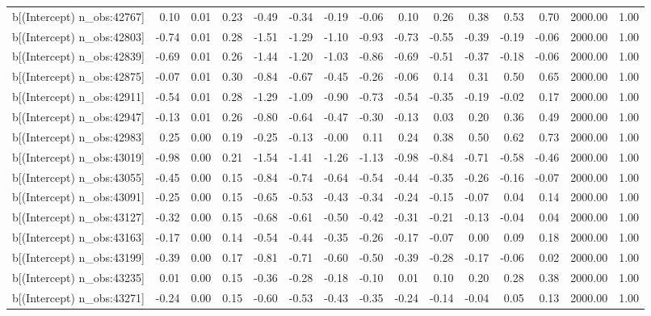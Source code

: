 \begin{table}[ht]
\begin{tabular}{rrrrrrrrrrrrrrr}
  b[(Intercept) n\_obs:42767] & 0.10 & 0.01 & 0.23 & -0.49 & -0.34 & -0.19 & -0.06 & 0.10 & 0.26 & 0.38 & 0.53 & 0.70 & 2000.00 & 1.00 \\ 
  b[(Intercept) n\_obs:42803] & -0.74 & 0.01 & 0.28 & -1.51 & -1.29 & -1.10 & -0.93 & -0.73 & -0.55 & -0.39 & -0.19 & -0.06 & 2000.00 & 1.00 \\ 
  b[(Intercept) n\_obs:42839] & -0.69 & 0.01 & 0.26 & -1.44 & -1.20 & -1.03 & -0.86 & -0.69 & -0.51 & -0.37 & -0.18 & -0.06 & 2000.00 & 1.00 \\ 
  b[(Intercept) n\_obs:42875] & -0.07 & 0.01 & 0.30 & -0.84 & -0.67 & -0.45 & -0.26 & -0.06 & 0.14 & 0.31 & 0.50 & 0.65 & 2000.00 & 1.00 \\ 
  b[(Intercept) n\_obs:42911] & -0.54 & 0.01 & 0.28 & -1.29 & -1.09 & -0.90 & -0.73 & -0.54 & -0.35 & -0.19 & -0.02 & 0.17 & 2000.00 & 1.00 \\ 
  b[(Intercept) n\_obs:42947] & -0.13 & 0.01 & 0.26 & -0.80 & -0.64 & -0.47 & -0.30 & -0.13 & 0.03 & 0.20 & 0.36 & 0.49 & 2000.00 & 1.00 \\ 
  b[(Intercept) n\_obs:42983] & 0.25 & 0.00 & 0.19 & -0.25 & -0.13 & -0.00 & 0.11 & 0.24 & 0.38 & 0.50 & 0.62 & 0.73 & 2000.00 & 1.00 \\ 
  b[(Intercept) n\_obs:43019] & -0.98 & 0.00 & 0.21 & -1.54 & -1.41 & -1.26 & -1.13 & -0.98 & -0.84 & -0.71 & -0.58 & -0.46 & 2000.00 & 1.00 \\ 
  b[(Intercept) n\_obs:43055] & -0.45 & 0.00 & 0.15 & -0.84 & -0.74 & -0.64 & -0.54 & -0.44 & -0.35 & -0.26 & -0.16 & -0.07 & 2000.00 & 1.00 \\ 
  b[(Intercept) n\_obs:43091] & -0.25 & 0.00 & 0.15 & -0.65 & -0.53 & -0.43 & -0.34 & -0.24 & -0.15 & -0.07 & 0.04 & 0.14 & 2000.00 & 1.00 \\ 
  b[(Intercept) n\_obs:43127] & -0.32 & 0.00 & 0.15 & -0.68 & -0.61 & -0.50 & -0.42 & -0.31 & -0.21 & -0.13 & -0.04 & 0.04 & 2000.00 & 1.00 \\ 
  b[(Intercept) n\_obs:43163] & -0.17 & 0.00 & 0.14 & -0.54 & -0.44 & -0.35 & -0.26 & -0.17 & -0.07 & 0.00 & 0.09 & 0.18 & 2000.00 & 1.00 \\ 
  b[(Intercept) n\_obs:43199] & -0.39 & 0.00 & 0.17 & -0.81 & -0.71 & -0.60 & -0.50 & -0.39 & -0.28 & -0.17 & -0.06 & 0.02 & 2000.00 & 1.00 \\ 
  b[(Intercept) n\_obs:43235] & 0.01 & 0.00 & 0.15 & -0.36 & -0.28 & -0.18 & -0.10 & 0.01 & 0.10 & 0.20 & 0.28 & 0.38 & 2000.00 & 1.00 \\ 
  b[(Intercept) n\_obs:43271] & -0.24 & 0.00 & 0.15 & -0.60 & -0.53 & -0.43 & -0.35 & -0.24 & -0.14 & -0.04 & 0.05 & 0.13 & 2000.00 & 1.00 \\ 

\end{tabular}
\end{table}
